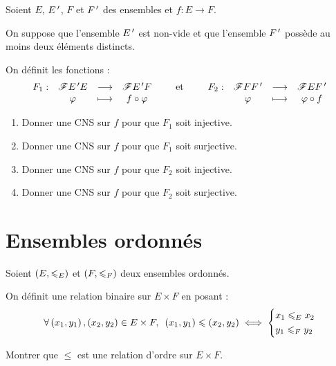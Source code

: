 \begin{exo}
Soient \(E\), \(E^{\,\prime}\), \(F\) et \(F^{\,\prime}\) des ensembles et \(f:E\to F\).

On suppose que l'ensemble \(E^{\,\prime}\) est non-vide et que l'ensemble \(F^{\,\prime}\) possède au moins deux éléments distincts.

On définit les fonctions : \[\begin{array}[t]{cccc}F_1 : & \mathscr{F}{E^{\,\prime}}{E} & \longrightarrow & \mathscr{F}{E^{\,\prime}}{F} \\ & \varphi & \longmapsto & f\circ\varphi\end{array}\qquad\text{et}\qquad\begin{array}[t]{cccc}F_2 : & \mathscr{F}{F}{F^{\,\prime}} & \longrightarrow & \mathscr{F}{E}{F^{\,\prime}} \\ & \varphi & \longmapsto & \varphi\circ f\end{array}\]

\begin{enumerate}
\item Donner une CNS sur \(f\) pour que \(F_1\) soit injective. \\

\item Donner une CNS sur \(f\) pour que \(F_1\) soit surjective. \\

\item Donner une CNS sur \(f\) pour que \(F_2\) soit injective. \\

\item Donner une CNS sur \(f\) pour que \(F_2\) soit surjective.
\end{enumerate}
\end{exo}

\begin{corr}
\end{corr}

\section{Ensembles ordonnés}

\begin{exo}
Soient \(\groupe{E}[\leq_E]\) et \(\groupe{F}[\leq_F]\) deux ensembles ordonnés.

On définit une relation binaire sur \(E\times F\) en posant : \[\quantifs{\forall\paren{x_1,y_1},\paren{x_2,y_2}\in E\times F}\paren{x_1,y_1}\leq\paren{x_2,y_2}\ssi\begin{dcases}x_1\leq_Ex_2 \\ y_1\leq_Fy_2\end{dcases}\]

Montrer que \(\leq\) est une relation d'ordre sur \(E\times F\).
\end{exo}

\begin{corr}
\end{corr}

